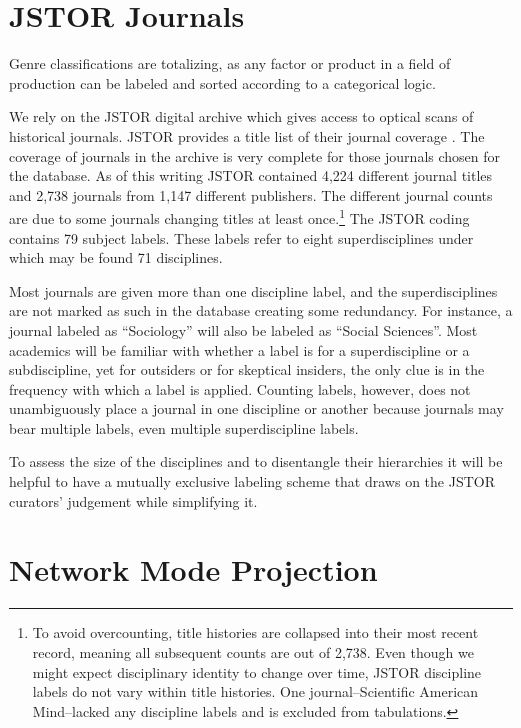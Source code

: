 \documentclass[]{book}
\let\rmarkdownfootnote\footnote%
\def\footnote{\protect\rmarkdownfootnote}
\theoremstyle{definition}
\theoremstyle{definition}
\theoremstyle{definition}
\theoremstyle{remark}
\begin{document}
\hypertarget{kd-dq1}{%
\section{JSTOR Journals}\label{kd-dq1}}

Genre classifications are totalizing, as any factor or product in a
field of production can be labeled and sorted according to a categorical
logic.

We rely on the JSTOR digital archive which gives access to optical scans
of historical journals. JSTOR provides a title list of their journal
coverage \citep{JSTOR2018Title}. The coverage of journals in the archive
is very complete for those journals chosen for the database. As of this
writing JSTOR contained 4,224 different journal titles and 2,738
journals from 1,147 different publishers. The different journal counts
are due to some journals changing titles at least once.\footnote{To
  avoid overcounting, title histories are collapsed into their most
  recent record, meaning all subsequent counts are out of 2,738. Even
  though we might expect disciplinary identity to change over time,
  JSTOR discipline labels do not vary within title histories. One
  journal--Scientific American Mind--lacked any discipline labels and is
  excluded from tabulations.} The JSTOR coding contains 79 subject
labels. These labels refer to eight superdisciplines under which may be
found 71 disciplines.

Most journals are given more than one discipline label, and the
superdisciplines are not marked as such in the database creating some
redundancy. For instance, a journal labeled as ``Sociology'' will also
be labeled as ``Social Sciences''. Most academics will be familiar with
whether a label is for a superdiscipline or a subdiscipline, yet for
outsiders or for skeptical insiders, the only clue is in the frequency
with which a label is applied. Counting labels, however, does not
unambiguously place a journal in one discipline or another because
journals may bear multiple labels, even multiple superdiscipline labels.

To assess the size of the disciplines and to disentangle their
hierarchies it will be helpful to have a mutually exclusive labeling
scheme that draws on the JSTOR curators' judgement while simplifying it.

\hypertarget{network-mode-projection}{%
\section{Network Mode Projection}\label{network-mode-projection}}
\end{document}
